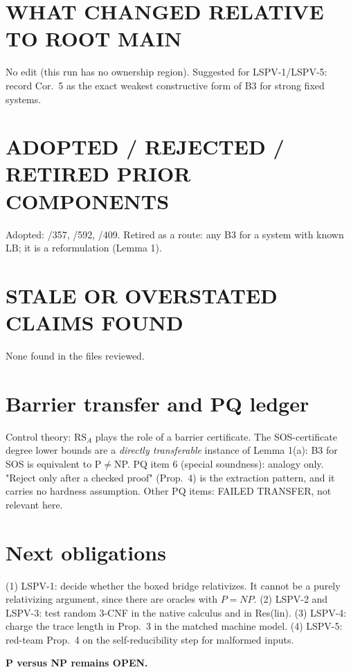\documentclass[11pt]{article}
\begin{document}
\section*{WHAT CHANGED RELATIVE TO ROOT MAIN}
No edit (this run has no ownership region). Suggested for LSPV-1/LSPV-5: record Cor.~5 as the exact
weakest constructive form of B3 for strong fixed systems.
\section*{ADOPTED / REJECTED / RETIRED PRIOR COMPONENTS}
Adopted: /357, /592, /409. Retired as a route: any B3 for a system with known $\mathrm{LB}$; it is a reformulation (Lemma 1).
\section*{STALE OR OVERSTATED CLAIMS FOUND}
None found in the files reviewed.
\section*{Barrier transfer and PQ ledger}
Control theory: $\mathrm{RS}_A$ plays the role of a barrier certificate. The SOS-certificate degree lower bounds are a
\emph{directly transferable} instance of Lemma 1(a): B3 for SOS is equivalent to P$\ne$NP. PQ item 6 (special soundness):
analogy only. "Reject only after a checked proof" (Prop.~4) is the extraction pattern, and it carries no
hardness assumption. Other PQ items: FAILED TRANSFER, not relevant here.
\section*{Next obligations}
(1) LSPV-1: decide whether the boxed bridge relativizes. It cannot be a purely relativizing argument, since there are oracles with $P=NP$.
(2) LSPV-2 and LSPV-3: test random 3-CNF in the native calculus and in Res(lin).
(3) LSPV-4: charge the trace length in Prop.~3 in the matched machine model.
(4) LSPV-5: red-team Prop.~4 on the self-reducibility step for malformed inputs.

\medskip\noindent\textbf{P versus NP remains OPEN.}
\end{document}
